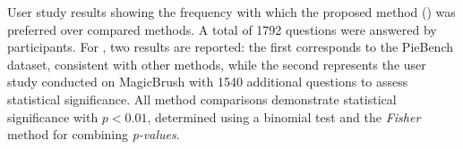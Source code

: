 {\begin{table}[htbp]
\caption{User study results showing the frequency with which {\modified{} the proposed method (\method{})} was preferred over {\modified{} compared methods}. A total of 1792 questions were answered by participants. For \directinversion{}, two results are reported: the first corresponds to the PieBench dataset{\modified{}}, consistent with other methods, while the second represents the user study conducted on MagicBrush with 1540 additional questions to assess statistical significance. All method comparisons demonstrate statistical significance with $p < 0.01$, determined using a binomial test and the \textit{Fisher} method for {\modified{}combining} \textit{p-values}.}



            \label{tab:user_study}
    \end{table}

    
    
    
    }
    